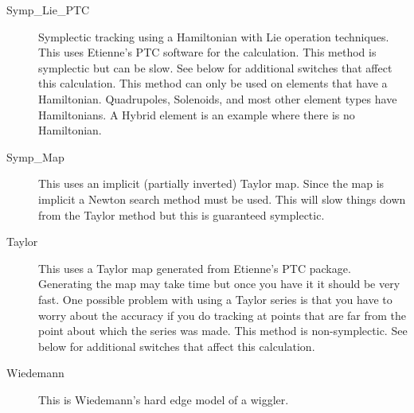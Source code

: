 \begin{description}
\item[Symp\_Lie\_PTC]
Symplectic tracking using a Hamiltonian with Lie operation techniques.
This uses Etienne's PTC software for the calculation. This method is
symplectic but can be slow. See below for additional switches that affect this
calculation. This method can only be used on elements that have a Hamiltonian.
Quadrupoles, Solenoids, and most other element types have Hamiltonians. A
Hybrid element is an  example where there is no Hamiltonian.

\item[Symp\_Map]
This uses an implicit (partially inverted) Taylor map.
Since the map is implicit a Newton search method must be used. This will slow
things down from the Taylor method but this is guaranteed symplectic.

\item[Taylor]
This uses a Taylor map generated from Etienne's PTC package. Generating
the map may take time but once you have it it should be very fast. One
possible problem with using a Taylor series is that you have to worry about
the accuracy if you do tracking at points that are far from the point about
which the series was made. This method is non-symplectic. See below for
additional switches that affect this calculation.

\item[Wiedemann]
This is Wiedemann's hard edge model of a wiggler.

\end{description}
